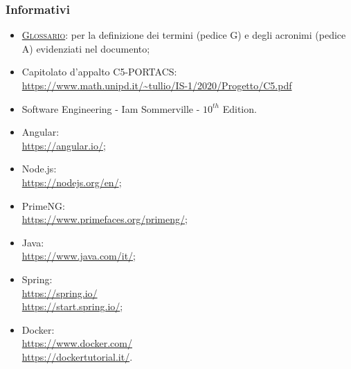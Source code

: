 \subsubsection{Informativi}
\begin{itemize}
	\item \textsc{\href{https://github.com/Three-Way-Milkshake/docs/wiki/Glossario}{Glossario}}: per la definizione dei termini (pedice G) e degli acronimi (pedice A) evidenziati nel documento;
	\item Capitolato d'appalto C5-PORTACS: \\
{\url{https://www.math.unipd.it/~tullio/IS-1/2020/Progetto/C5.pdf}}
	\item Software Engineering - Iam Sommerville - $10^{th}$ Edition.
	\item Angular: \\ {\url{https://angular.io/}};
	\item Node.js: \\ {\url{https://nodejs.org/en/}};
	\item PrimeNG: \\ {\url{https://www.primefaces.org/primeng/}};
	\item Java: \\ {\url{https://www.java.com/it/}};
	\item Spring: \\ {\url{https://spring.io/}} \\ \url{https://start.spring.io/};
	\item Docker: \\ {\url{https://www.docker.com/}} \\ \url{https://dockertutorial.it/}.

\end{itemize}
